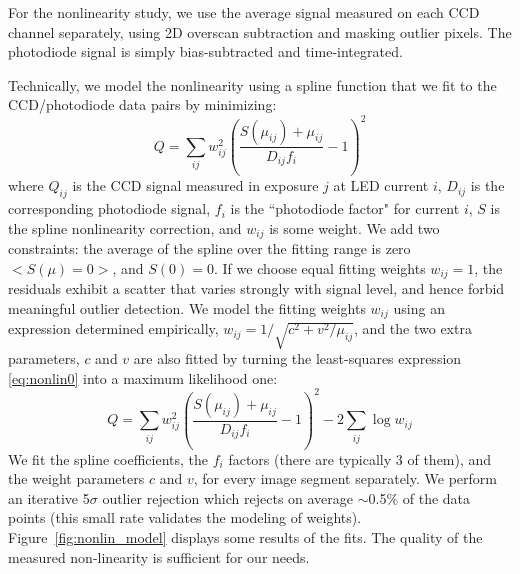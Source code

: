 For the nonlinearity study, we use the average signal measured on each CCD channel separately, using 2D overscan subtraction and masking outlier pixels. The photodiode signal is simply bias-subtracted and time-integrated.

Technically, we model the nonlinearity using a spline function that we fit to the CCD/photodiode data pairs by minimizing:
\begin{equation}
Q = \sum_{ij} w_{ij}^2 \left( \frac{ S(\mu_{ij}) +\mu_{ij}  }{D_{ij} f_i} -1 \right)^2
\label{eq:nonlin0}
\end{equation}
where $Q_{ij}$ is the CCD signal measured in exposure $j$ at LED current $i$,
$D_{ij}$ is the corresponding photodiode signal, $f_i$ is the ``photodiode factor" for current $i$, $S$ is the spline nonlinearity correction, and $w_{ij}$ is some weight. We add two constraints: the average of the spline over the fitting range is zero $<S(\mu)=0>$, and $S(0) = 0$. If we choose equal fitting weights $w_{ij}=1$, the residuals exhibit a scatter that varies strongly with signal level, and hence forbid meaningful outlier detection. We model the fitting weights $w_{ij}$ using an expression determined empirically, $w_{ij} = 1/\sqrt{c^2+v^2/\mu_{ij}}$, and the two extra parameters, $c$ and $v$ are also fitted by turning the least-squares expression \ref{eq:nonlin0} into a maximum likelihood one:
\begin{equation}
Q = \sum_{ij} w_{ij}^2 \left( \frac{ S(\mu_{ij}) +\mu_{ij}  }{D_{ij} f_i} -1 \right)^2 - 2 \sum_{ij} \log w_{ij}
\label{eq:nonlin1}
\end{equation}
We fit the spline coefficients, the $f_i$ factors (there are typically 3 of them), and the weight parameters $c$ and $v$, for every image segment separately. We perform an iterative 5$\sigma$ outlier rejection which rejects on average $\sim $0.5\% of the data points (this small rate validates the modeling of weights). Figure~\ref{fig:nonlin_model} displays some results of the fits. The quality of the measured non-linearity is sufficient for our needs.

